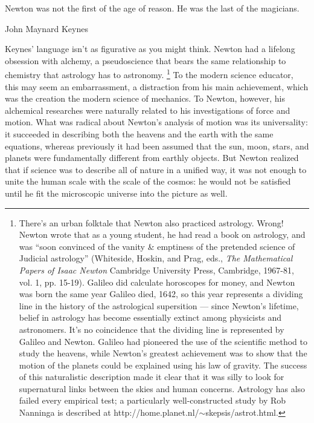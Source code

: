 \label{ch:em}\label{sunspotphoto}
\epigraph{Newton was not the first of the age of reason. He was the
	last of the magicians.}{John Maynard Keynes}

	Keynes' language isn't as figurative as you might think. Newton
	had a lifelong obsession with alchemy, a pseudoscience that bears
	the same relationship to chemistry that astrology has
	to astronomy.
\footnote{There's an urban folktale that Newton also practiced astrology. Wrong!
Newton wrote that as a young student, he had read a book on astrology, and was
``soon convinced of the vanity \& emptiness of the pretended science of Judicial astrology''
(Whiteside, Hoskin, and Prag, eds., 
\emph{The Mathematical Papers of Isaac Newton}
Cambridge University Press, Cambridge, 1967-81, vol. 1, pp. 15-19).
Galileo did calculate horoscopes for money, and Newton was born the same year Galileo died,
1642, so this year represents a dividing line in the history of the astrological
supersition --- since Newton's lifetime, belief in astrology has become essentially
extinct among physicists and astronomers. It's no coincidence that the dividing
line is represented by Galileo and Newton.
Galileo had pioneered the use of the
scientific method to study the heavens, while Newton's greatest achievement
was to show that the motion of the planets could be explained using his law of
gravity. The success of this naturalistic description made it clear that it was silly
to look for supernatural links between the skies and human concerns.
Astrology has also failed every empirical test; a particularly well-constructed
study by Rob Nanninga is described at http://home.planet.nl/$\sim$skepsis/astrot.html.
}
	To the modern science educator, this
	may seem an embarrassment, a distraction from
	his main achievement, which was the creation the modern science of
	mechanics. To Newton, however, his alchemical researches
	were naturally related to his investigations of force and
	motion. What was radical about Newton's analysis of motion
	was its universality: it succeeded in describing both the
	heavens and the earth with the same equations, whereas
	previously it had been assumed that the sun, moon, stars,
	and planets were fundamentally different from earthly
	objects. But Newton realized that if science was to describe
	all of nature in a unified way, it was not enough to unite
	the human scale with the scale of the cosmos: he would not
	be satisfied until he fit the microscopic universe into
	the picture as well.

